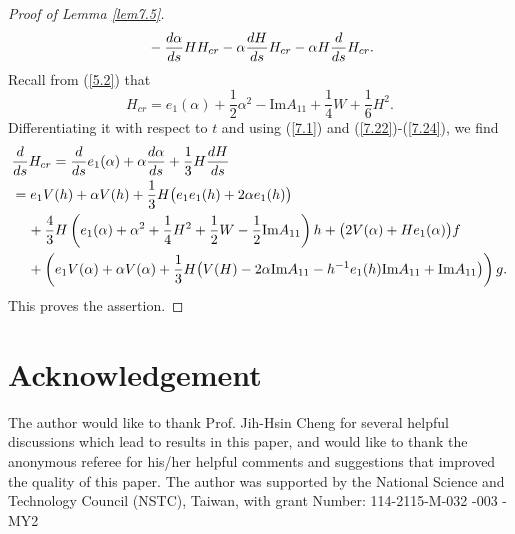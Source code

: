 \documentclass{amsart}
\theoremstyle{Corollary}
\numberwithin{equation}{section}
\begin{document}
\begin{proof}[Proof of Lemma \ref{lem7.5}]
\begin{align*}
&\hspace{4mm}-\frac{d\alpha}{ds} H H_{cr}-\alpha\frac{dH}{ds}H_{cr}
-\alpha H\frac{d}{ds}H_{cr}. 
\end{align*}
Recall from (\ref{5.2}) that 
$$H_{cr}=e_1(\alpha)+\frac{1}{2}\alpha^2-\mbox{Im} A_{11}+\frac{1}{4}W+\frac{1}{6}H^2.$$
Differentiating it with respect to $t$ and using 
(\ref{7.1}) and (\ref{7.22})-(\ref{7.24}), we find 
\begin{align*}
&\frac{d}{ds}H_{cr}=\frac{d}{ds}e_1(\alpha)+\alpha\frac{d\alpha}{ds}+\frac{1}{3}H\frac{dH}{ds}\\
&=e_1V(h)+\alpha V(h)+\frac{1}{3}H\big(e_1e_1(h)+2\alpha e_1(h)\big)\\
&\hspace{4mm}+\frac{4}{3}H\left(e_1(\alpha)+\alpha^2+\frac{1}{4}H^2+\frac{1}{2}W-\frac{1}{2}\mbox{Im}A_{11}\right)h
+\big(2V(\alpha)+He_1(\alpha)\big)f\\
&\hspace{4mm}+\left(e_1V(\alpha)+\alpha V(\alpha)
+\frac{1}{3}H\big(V(H)-2\alpha\mbox{Im}A_{11}-h^{-1}e_1(h)\mbox{Im}A_{11}+\mbox{Im}A_{11}\big)\right)g.
\end{align*}
This proves the assertion. 
\end{proof}

\section*{Acknowledgement}

The author would like to thank Prof. Jih-Hsin Cheng
for several helpful discussions which lead to results 
in this paper, and would like to thank the anonymous referee
for his/her helpful comments and suggestions that improved the
quality of this paper. 
The author was supported  by the National Science and Technology Council (NSTC),
Taiwan, with grant Number: 114-2115-M-032 -003 -MY2
\end{document}
